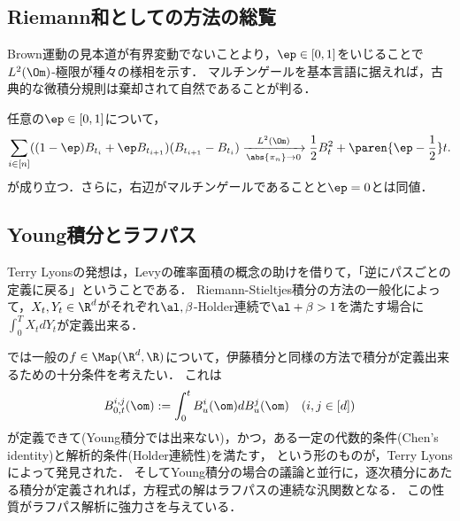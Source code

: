 \documentclass[uplatex,dvipdfmx]{jsreport}
\begin{document}
\subsection{Riemann和としての方法の総覧}

\begin{tcolorbox}[colframe=ForestGreen, colback=ForestGreen!10!white,breakable,colbacktitle=ForestGreen!40!white,coltitle=black,fonttitle=\bfseries\sffamily,
title=マルチンゲールになるのは伊藤積分のみ]
    Brown運動の見本道が有界変動でないことより，$\ep\in[0,1]$をいじることで$L^2(\Om)$-極限が種々の様相を示す．
    マルチンゲールを基本言語に据えれば，古典的な微積分規則は棄却されて自然であることが判る．
\end{tcolorbox}

\begin{proposition}
    任意の$\ep\in[0,1]$について，
    \[\sum_{i\in[n]}((1-\ep)B_{t_i}+\ep B_{t_{i+1}})(B_{t_{i+1}}-B_{t_i})\xrightarrow[\abs{\pi_n}\to0]{L^2(\Om)}\frac{1}{2}B_t^2+\paren{\ep-\frac{1}{2}}t.\]
    が成り立つ．さらに，右辺がマルチンゲールであることと$\ep=0$とは同値．
\end{proposition}

\subsection{Young積分とラフパス}

\begin{tcolorbox}[colframe=ForestGreen, colback=ForestGreen!10!white,breakable,colbacktitle=ForestGreen!40!white,coltitle=black,fonttitle=\bfseries\sffamily,
title=]
    Terry Lyonsの発想は，Levyの確率面積の概念の助けを借りて，「逆にパスごとの定義に戻る」ということである．
    Riemann-Stieltjes積分の方法の一般化によって，$X_t,Y_t\in\R^d$がそれぞれ$\al,\beta$-Holder連続で$\al+\beta>1$を満たす場合に$\int^T_0X_tdY_t$が定義出来る．
\end{tcolorbox}


\begin{history}
    では一般の$f\in\Map(\R^d,\R)$について，伊藤積分と同様の方法で積分が定義出来るための十分条件を考えたい．
    これは
    \[B^{i,j}_{0,t}(\om):=\int^t_0B^i_u(\om)dB^j_u(\om)\quad(i,j\in[d])\]
    が定義できて(Young積分では出来ない)，かつ，ある一定の代数的条件(Chen's identity)と解析的条件(Holder連続性)を満たす，
    という形のものが，Terry Lyonsによって発見された．
    そしてYoung積分の場合の議論と並行に，逐次積分にあたる積分が定義されれば，方程式の解はラフパスの連続な汎関数となる．
    この性質がラフパス解析に強力さを与えている．
\end{history}
\end{document}
